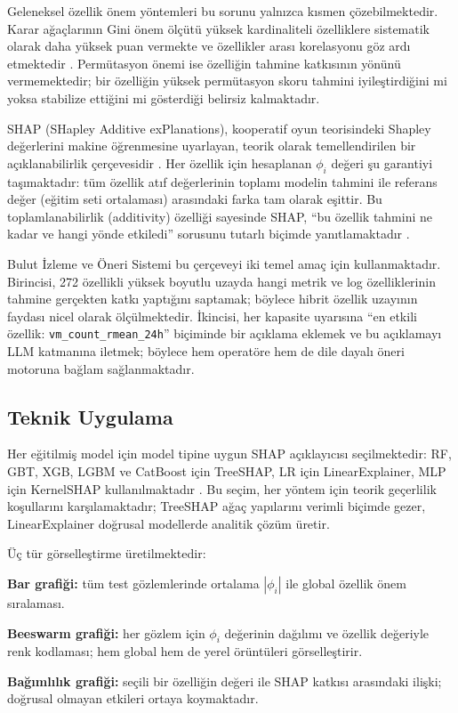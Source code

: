 Geleneksel özellik önem yöntemleri bu sorunu yalnızca kısmen çözebilmektedir.
Karar ağaçlarının Gini önem ölçütü yüksek kardinaliteli özelliklere sistematik olarak daha yüksek puan vermekte ve özellikler arası korelasyonu göz ardı etmektedir \autocite{breiman2001}.
Permütasyon önemi ise özelliğin tahmine katkısının yönünü vermemektedir; bir özelliğin yüksek permütasyon skoru tahmini iyileştirdiğini mi yoksa stabilize ettiğini mi gösterdiği belirsiz kalmaktadır.

SHAP (SHapley Additive exPlanations), kooperatif oyun teorisindeki Shapley değerlerini makine öğrenmesine uyarlayan, teorik olarak temellendirilen bir açıklanabilirlik çerçevesidir \autocite{lundberg2017}.
Her özellik için hesaplanan $\phi_i$ değeri şu garantiyi taşımaktadır: tüm özellik atıf değerlerinin toplamı modelin tahmini ile referans değer (eğitim seti ortalaması) arasındaki farka tam olarak eşittir.
Bu toplamlanabilirlik (additivity) özelliği sayesinde SHAP, ``bu özellik tahmini ne kadar ve hangi yönde etkiledi'' sorusunu tutarlı biçimde yanıtlamaktadır \autocite{lundberg2020}.

Bulut İzleme ve Öneri Sistemi bu çerçeveyi iki temel amaç için kullanmaktadır.
Birincisi, 272 özellikli yüksek boyutlu uzayda hangi metrik ve log özelliklerinin tahmine gerçekten katkı yaptığını saptamak; böylece hibrit özellik uzayının faydası nicel olarak ölçülmektedir.
İkincisi, her kapasite uyarısına ``en etkili özellik: \texttt{vm\_count\_rmean\_24h}'' biçiminde bir açıklama eklemek ve bu açıklamayı LLM katmanına iletmek; böylece hem operatöre hem de dile dayalı öneri motoruna bağlam sağlanmaktadır.

\subsection{Teknik Uygulama}

Her eğitilmiş model için model tipine uygun SHAP açıklayıcısı seçilmektedir: RF, GBT, XGB, LGBM ve CatBoost için TreeSHAP, LR için LinearExplainer, MLP için KernelSHAP kullanılmaktadır \autocite{lundberg2017, lundberg2020}.
Bu seçim, her yöntem için teorik geçerlilik koşullarını karşılamaktadır; TreeSHAP ağaç yapılarını verimli biçimde gezer, LinearExplainer doğrusal modellerde analitik çözüm üretir.

Üç tür görselleştirme üretilmektedir:
\begin{maddelendir}[label=--]
    \item \textbf{Bar grafiği:} tüm test gözlemlerinde ortalama $|\phi_i|$ ile global özellik önem sıralaması.
    \item \textbf{Beeswarm grafiği:} her gözlem için $\phi_i$ değerinin dağılımı ve özellik değeriyle renk kodlaması; hem global hem de yerel örüntüleri görselleştirir.
    \item \textbf{Bağımlılık grafiği:} seçili bir özelliğin değeri ile SHAP katkısı arasındaki ilişki; doğrusal olmayan etkileri ortaya koymaktadır.
\end{maddelendir}

